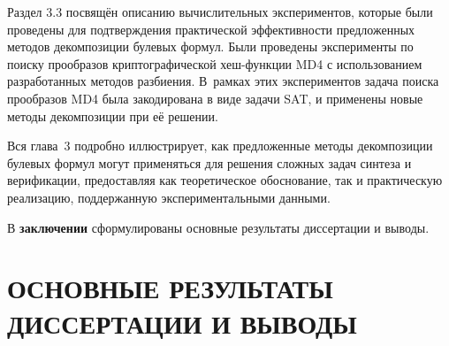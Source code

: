 
Раздел 3.3 посвящён описанию вычислительных экспериментов, которые были проведены для подтверждения практической эффективности предложенных методов декомпозиции булевых формул.
Были проведены эксперименты по поиску прообразов криптографической хеш-функции MD4 с использованием разработанных методов разбиения.
В~рамках этих экспериментов задача поиска прообразов MD4 была закодирована в виде задачи SAT, и применены новые методы декомпозиции при её решении.


Вся глава~3 подробно иллюстрирует, как предложенные методы декомпозиции булевых формул могут применяться для решения сложных задач синтеза и верификации, предоставляя как теоретическое обоснование, так и практическую реализацию, поддержанную экспериментальными данными.


В \textbf{заключении} сформулированы основные результаты диссертации и выводы.


\section*{ОСНОВНЫЕ РЕЗУЛЬТАТЫ ДИССЕРТАЦИИ И ВЫВОДЫ}

